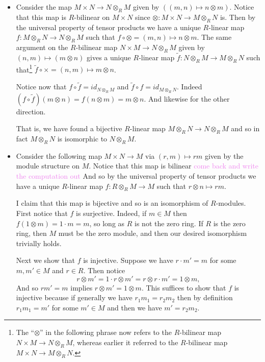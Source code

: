 \documentclass[12pt,letterpaper,boxed]{hmcpset}
\newcommand{\wg}[1]{\textcolor{violet}{#1}}
\begin{document}
\begin{solution}
\begin{itemize}
\item Consider the map $M \times N \to N \otimes_R M$ given by $((m,n)
\mapsto n \otimes m)$. Notice that this map is $R$-bilinear on $M \times
N$ since $\otimes: M \times N \to M \otimes_R N$ is.
Then by the universal property of tensor products we have a unique
$R$-linear map $f: M \otimes_R N \to N \otimes_R M$ such that $f \circ
\otimes = (m,n) \mapsto n \otimes m$. 
The same argument on the $R$-bilinear map $N \times M \to N \otimes_R
M$ given by $(n,m) \mapsto (m \otimes n)$ gives a unique $R$-linear
map $\tilde f: N \otimes_R M \to M \otimes_R N$ such that\footnote{
The ``$\otimes$'' in the following phrase now refers to the
$R$-bilinear map $N \times M \to N \otimes_R M$, whereas earlier it
referred to the $R$-bilinear map $M \times N \to M \otimes_R N$.
} $\tilde f
\circ \times = (n,m) \mapsto m \otimes n$. 

Notice now that $f \circ \tilde f = id_{N \otimes_R M}$ and $\tilde f
\circ f = id_{M \otimes_R N}$. Indeed $(f \circ \tilde f)(m \otimes n)
= f(n \otimes m) = m \otimes n$. And likewise for the other direction.

That is, we have found a bijective $R$-linear map $M \otimes_R N \to N
\otimes_R M$ and so in fact $M \otimes_R N$ is isomorphic to $N
\otimes_R M$.


\item Consider the following map $M \times N \to M$ via $(r,m) \mapsto
rm$ given by the module structure on $M$. Notice that this map is
bilinear \wg{come back and write the computation out}
And so by the universal property of tensor products we have a unique
$R$-linear map $f: R \otimes_R M \to M$ such that $r \otimes n
\mapsto rm$. 

I claim that this map is bijective and so is an isomorphism of
$R$-modules. First notice that $f$ is surjective. Indeed, if $m \in M$
then $f(1 \otimes m) = 1\cdot m = m$, so long as $R$ is not the zero
ring. If $R$ is the zero ring, then $M$ must be the zero module, and
then our desired isomorphism trivially holds. 

Next we show that $f$ is injective. 
Suppose we have $r \cdot m' = m$ for some $m,m' \in M$ and
$r \in R$. Then notice 
\[
	r \otimes m' = 1 \cdot r \otimes m' = r
		\otimes r \cdot m' = 1 \otimes m,
\]
And so $rm' = m$ implies $r \otimes m' = 1 \otimes m$. This suffices
to show that $f$ is injective because if generally we have $r_1 m_1 =
r_2 m_2$ then by definition $r_1 m_1 = m'$ for some $m' \in M$ and
then we have $m' = r_2 m_2$. 


\end{itemize}
\end{solution}
\end{document}
